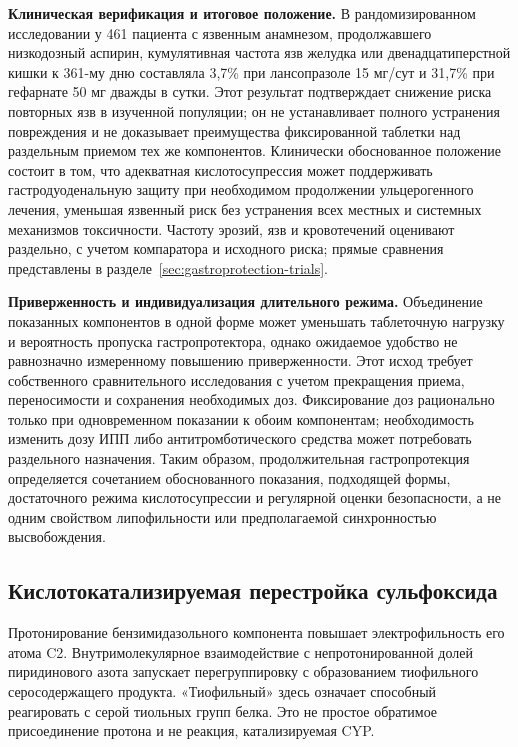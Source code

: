 \documentclass[11pt,a4paper,notitlepage]{report}
\newcommand{\src}[1]{\unskip\space\cite{#1}}
\begin{document}
\textbf{Клиническая верификация и итоговое положение.} В рандомизированном исследовании у 461 пациента с язвенным анамнезом, продолжавшего низкодозный аспирин, кумулятивная частота язв желудка или двенадцатиперстной кишки к 361-му дню составляла 3,7\% при лансопразоле 15 мг/сут и 31,7\% при гефарнате 50 мг дважды в сутки. Этот результат подтверждает снижение риска повторных язв в изученной популяции; он не устанавливает полного устранения повреждения и не доказывает преимущества фиксированной таблетки над раздельным приемом тех же компонентов.\src{aspirin15} Клинически обоснованное положение состоит в том, что адекватная кислотосупрессия может поддерживать гастродуоденальную защиту при необходимом продолжении ульцерогенного лечения, уменьшая язвенный риск без устранения всех местных и системных механизмов токсичности. Частоту эрозий, язв и кровотечений оценивают раздельно, с учетом компаратора и исходного риска; прямые сравнения представлены в разделе~\ref{sec:gastroprotection-trials}.\src{misotrial,aspirintrial,nsaid15}

\textbf{Приверженность и индивидуализация длительного режима.} Объединение показанных компонентов в одной форме может уменьшать таблеточную нагрузку и вероятность пропуска гастропротектора, однако ожидаемое удобство не равнозначно измеренному повышению приверженности. Этот исход требует собственного сравнительного исследования с учетом прекращения приема, переносимости и сохранения необходимых доз. Фиксирование доз рационально только при одновременном показании к обоим компонентам; необходимость изменить дозу ИПП либо антитромботического средства может потребовать раздельного назначения. Таким образом, продолжительная гастропротекция определяется сочетанием обоснованного показания, подходящей формы, достаточного режима кислотосупрессии и регулярной оценки безопасности, а не одним свойством липофильности или предполагаемой синхронностью высвобождения.\src{fdctakeldalaunch,fdctakeldareview,fdctakeldalabel}

\subsection{Кислотокатализируемая перестройка сульфоксида}
Протонирование бензимидазольного компонента повышает электрофильность его атома C2. Внутримолекулярное взаимодействие с непротонированной долей пиридинового азота запускает перегруппировку с образованием тиофильного серосодержащего продукта. «Тиофильный» здесь означает способный реагировать с серой тиольных групп белка. Это не простое обратимое присоединение протона и не реакция, катализируемая CYP.\src{molchem,molkinetics}
\end{document}

